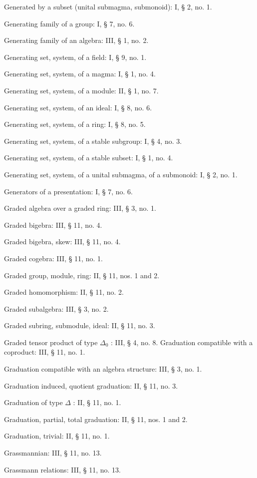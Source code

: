 Generated by a subset (unital submagma, submonoid): I, § 2, no. 1.

Generating family of a group: I, § 7, no. 6.

Generating family of an algebra: III, § 1, no. 2.

Generating set, system, of a field: I, § 9, no. 1.

Generating set, system, of a magma: I, § 1, no. 4.

Generating set, system, of a module: II, § 1, no. 7.

Generating set, system, of an ideal: I, § 8, no. 6.

Generating set, system, of a ring: I, § 8, no. 5.

Generating set, system, of a stable subgroup: I, § 4, no. 3.

Generating set, system, of a stable subset: I, § 1, no. 4.

Generating set, system, of a unital submagma, of a submonoid: I, § 2, no. 1.

Generators of a presentation: I, § 7, no. 6.

Graded algebra over a graded ring: III, § 3, no. 1.

Graded bigebra: III, § 11, no. 4.

Graded bigebra, skew: III, § 11, no. 4.

Graded cogebra: III, § 11, no. 1.

Graded group, module, ring: II, § 11, nos. 1 and 2.

Graded homomorphism: II, § 11, no. 2.

Graded subalgebra: III, § 3, no. 2.

Graded subring, submodule, ideal: II, § 11, no. 3.

Graded tensor product of type \(\Delta_0\) : III, § 4, no. 8.
\relax{}
Graduation compatible with a coproduct: III, § 11, no. 1.

Graduation compatible with an algebra structure: III, § 3, no. 1.

Graduation induced, quotient graduation: II, § 11, no. 3.

Graduation of type \(\Delta\) : II, § 11, no. 1.

Graduation, partial, total graduation: II, § 11, nos. 1 and 2.

Graduation, trivial: II, § 11, no. 1.

Grassmannian: III, § 11, no. 13.

Grassmann relations: III, § 11, no. 13.

